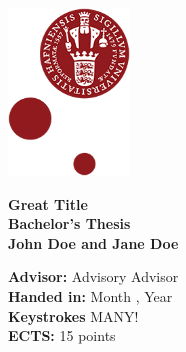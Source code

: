
\begin{titlepage}
\begin{flushleft}
\end{flushleft}

\setlength{\columnsep}{0.5in}
\setcolumnwidth{4in, 1.07in}

\begin{paracol}{2}
    \begin{tcolorbox}[blanker, breakable, width=\linewidth]
    \vspace*{0.25in}
    \onehalfspacing
    \end{tcolorbox}
    \switchcolumn
    \begin{tcolorbox}[blanker, breakable, width=\linewidth]
        \hfill\includegraphics[width=1.27in]{99 graphics/KU-logo.png}
    \end{tcolorbox}
\end{paracol}

\vspace*{-0.93cm}
\noindent\textcolor{KUrod}{\makebox[\linewidth]{\rule{\paperwidth}{0.4pt}}} 

\begin{flushleft}
    \vspace{5cm}
    \Large \textbf{Great Title}\\

    \vspace{3cm}
    \Large \textbf{Bachelor's Thesis}\\
    \large \textbf{John Doe and Jane Doe}

\vfill
\normalsize
    \textbf{Advisor:} Advisory Advisor\\
    \textbf{Handed in:} Month , Year\\
    \textbf{Keystrokes} MANY! \\
    \textbf{ECTS:} 15 points
\end{flushleft}
\end{titlepage}
